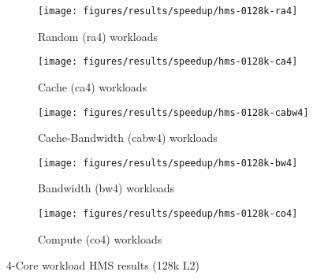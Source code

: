 \begin{figure}
    \centering
    \begin{subfigure}[b]{\textwidth}
            \texttt{[image: figures/results/speedup/hms-0128k-ra4]}
            \caption{Random (ra4) workloads}
            \label{fig:results:4core:hms:random}
    \end{subfigure}

    \begin{subfigure}[b]{0.5\textwidth}
            \texttt{[image: figures/results/speedup/hms-0128k-ca4]}
            \caption{Cache (ca4) workloads}
            \label{fig:results:4core:hms:cache}
    \end{subfigure}%
    \begin{subfigure}[b]{0.5\textwidth}
            \texttt{[image: figures/results/speedup/hms-0128k-cabw4]}
            \caption{Cache-Bandwidth (cabw4) workloads}
            \label{fig:results:4core:hms:cache-bw}
    \end{subfigure}

    \begin{subfigure}[b]{0.5\textwidth}
            \texttt{[image: figures/results/speedup/hms-0128k-bw4]}
            \caption{Bandwidth (bw4) workloads}
            \label{fig:results:4core:hms:bw}
    \end{subfigure}%
    \begin{subfigure}[b]{0.5\textwidth}
            \texttt{[image: figures/results/speedup/hms-0128k-co4]}
            \caption{Compute (co4) workloads}
            \label{fig:results:4core:hms:co}
    \end{subfigure}%

    \caption{4-Core workload HMS results (128k L2)}\label{fig:results:4core:hms}
\end{figure}

